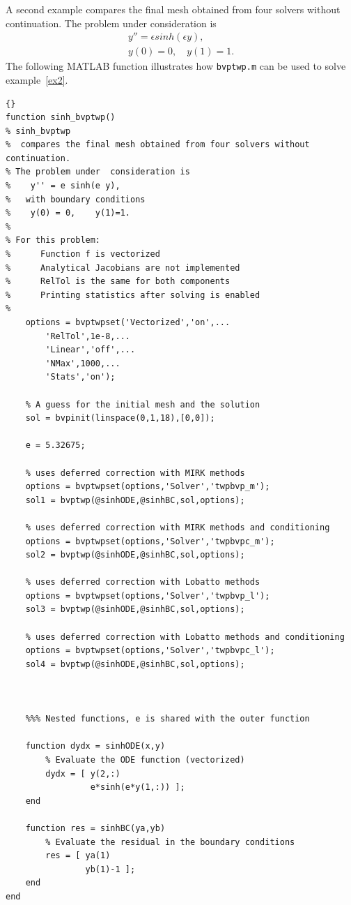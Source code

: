 \documentclass{article}
\begin{document}
A second example compares the final mesh obtained from four solvers without continuation. The problem under
consideration is
\begin{equation}
\label{ex2}
\begin{array}{l}
  y'' = \epsilon sinh(\epsilon y), \\
  y(0) = 0,\quad y(1)=1.
\end{array}
\end{equation}
The following MATLAB function illustrates how \texttt{bvptwp.m} can be
used to solve  example~\eqref{ex2}.
\begin{lstlisting}[fontadjust]{}
function sinh_bvptwp()
% sinh_bvptwp
%  compares the final mesh obtained from four solvers without continuation.
% The problem under  consideration is
%    y'' = e sinh(e y),
%   with boundary conditions
%    y(0) = 0,    y(1)=1.
%
% For this problem: 
%      Function f is vectorized
%      Analytical Jacobians are not implemented
%      RelTol is the same for both components
%      Printing statistics after solving is enabled
%
    options = bvptwpset('Vectorized','on',...
		'RelTol',1e-8,...
		'Linear','off',...
		'NMax',1000,...
		'Stats','on');

    % A guess for the initial mesh and the solution
    sol = bvpinit(linspace(0,1,18),[0,0]);

    e = 5.32675;

    % uses deferred correction with MIRK methods
    options = bvptwpset(options,'Solver','twpbvp_m');
    sol1 = bvptwp(@sinhODE,@sinhBC,sol,options);

    % uses deferred correction with MIRK methods and conditioning
    options = bvptwpset(options,'Solver','twpbvpc_m');
    sol2 = bvptwp(@sinhODE,@sinhBC,sol,options);

    % uses deferred correction with Lobatto methods
    options = bvptwpset(options,'Solver','twpbvp_l');
    sol3 = bvptwp(@sinhODE,@sinhBC,sol,options);

    % uses deferred correction with Lobatto methods and conditioning
    options = bvptwpset(options,'Solver','twpbvpc_l');
    sol4 = bvptwp(@sinhODE,@sinhBC,sol,options);



    %%% Nested functions, e is shared with the outer function

    function dydx = sinhODE(x,y)
        % Evaluate the ODE function (vectorized)
        dydx = [ y(2,:)
                 e*sinh(e*y(1,:)) ];
    end

    function res = sinhBC(ya,yb)
        % Evaluate the residual in the boundary conditions
        res = [ ya(1)
                yb(1)-1 ];
    end
end

\end{lstlisting}
\end{document}
